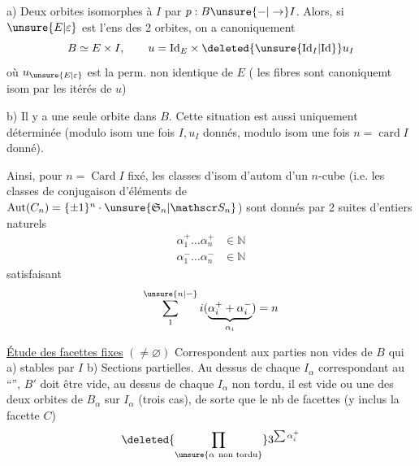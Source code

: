 a) Deux orbites isomorphes à $I$  par $p:B\unsure{-|\to} I$. Alors, si  $\unsure{E|\varepsilon}$ est l'ens des 2 orbites, on a canoniquement
\[
 B\simeq E\times I,\qquad u=\mathrm{Id}_E\times\deleted{\unsure{\mathrm{Id}_I|\mathrm{Id}}}u_I
\]
où $u_{\unsure{E|\varepsilon}}$ est la  perm. non identique de $E$ ( les fibres sont canoniquemt isom par les itérés de $u$)

b) Il y a une seule orbite dans $B$. Cette situation est aussi uniquement déterminée (modulo isom  une fois $I,u_I$ donnés, modulo isom une fois $n=\operatorname{card}I$ donné).


Ainsi, pour $n=\operatorname{Card}I$ fixé, les classes d'isom d'autom d'un $n$-cube (i.e. les classes de conjugaison d'éléments de $\operatorname{Aut}(C_n)=\{\pm1\}^n\cdot\unsure{\mathfrak S_n|\mathscr S_n}$) sont donnés par 2 suites d'entiers naturels
\[
\begin{aligned}
\alpha_1^+\ldots\alpha_n^+&\in\mathbb N\\
\alpha_1^-\ldots\alpha_n^-&\in\mathbb N
\end{aligned}
\]
satisfaisant
\[
\sum_1^{\unsure{n|\relbar}}i(\underbrace{\alpha_i^++\alpha_i^-}_{\alpha_i})=n
\]

\uline{Étude des facettes fixes} $(\ne\varnothing)$  Correspondent aux parties non vides  de $B$ qui a) stables par $I$ b) Sections partielles. Au dessus de chaque $I_\alpha$ correspondant au ``'',
$B'$ doit être vide, au dessus de chaque $I_\alpha$ non tordu, il est  vide ou une des deux orbites de $B_\alpha$ sur $I_\alpha$ (trois cas), de sorte que le nb de  facettes  (y inclus la facette $C$)
\[
\deleted{\prod_{\unsure{\alpha\ \text{non tordu}}}}3^{\sum\alpha_i^+}
\]

